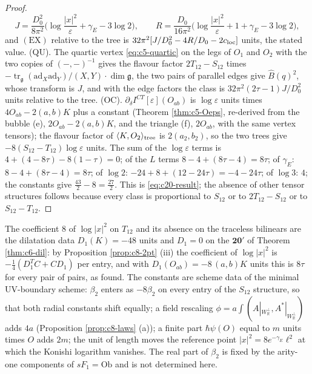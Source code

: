 \begin{proof}
\[
J=\frac{D_0^2}{8\pi^2}\Big(\log\frac{|x|^2}{\varepsilon}+\gamma_E-3\log2\Big),\qquad R=\frac{D_0}{16\pi^2}\Big(\log\frac{|x|^2}{\varepsilon}+1+\gamma_E-3\log2\Big),
\]
and $\mathrm{(EX)}$ relative to the tree is $32\pi^2[J/D_0^2-4R/D_0-2c_{\rm loc}]$ units, the stated value. (QU). The quartic vertex \eqref{eq:c5-quartic} on the legs of $O_1$ and $O_2$ with the two copies of $(-,-)^{-1}$ gives the flavour factor $2T_{12}-S_{12}$ times $-\operatorname{tr}_{\mathfrak g}(\mathrm{ad}_X\mathrm{ad}_Y)/(X,Y)\cdot\dim\mathfrak g$, the two pairs of parallel edges give $\hat B(q)^2$, whose transform is $J$, and with the edge factors the class is $32\pi^2(2\tau-1)J/D_0^2$ units relative to the tree. (OC). $\partial_\delta I^{CT}[\varepsilon](O_{ab})$ is $\log\varepsilon$ units times $4O_{ab}-2(a,b)K$ plus a constant (Theorem \ref{thm:c5-Oeps}, re-derived from the bubble (e), $2O_{ab}-2(a,b)K$, and the triangle (f), $2O_{ab}$, with the same vertex tensors); the flavour factor of $\langle K,O_2\rangle_{\rm tree}$ is $2(a_2,b_2)$, so the two trees give $-8(S_{12}-T_{12})\log\varepsilon$ units. The sum of the $\log\varepsilon$ terms is $4+(4-8\tau)-8(1-\tau)=0$; of the $L$ terms $8-4+(8\tau-4)=8\tau$; of $\gamma_E$: $8-4+(8\tau-4)=8\tau$; of $\log2$: $-24+8+(12-24\tau)=-4-24\tau$; of $\log3$: $4$; the constants give $\tfrac{43}2-8=\tfrac{27}2$. This is \eqref{eq:c20-result}; the absence of other tensor structures follows because every class is proportional to $S_{12}$ or to $2T_{12}-S_{12}$ or to $S_{12}-T_{12}$.
\end{proof}

\begin{remark}
\label{rem:c20-scheme}
The coefficient $8$ of $\log|x|^2$ on $T_{12}$ and its absence on the traceless bilinears are the dilatation data $D_1(K)=-48$ units and $D_1=0$ on the $\mathbf{20'}$ of Theorem \ref{thm:c6-dil}: by Proposition \ref{prop:c8-2pt} (iii) the coefficient of $\log|x|^2$ is $-\tfrac14(D_1^TC+CD_1)$ per entry, and with $D_1(O_{ab})=-8\,(a,b)K$ units this is $8\tau$ for every pair of pairs, as found. The constants are scheme data of the minimal UV-boundary scheme: $\beta_2$ enters as $-8\beta_2$ on every entry of the $S_{12}$ structure, so that both radial constants shift equally; a field rescaling $\phi=a\int(A|_{W_{\mathbb R}^\perp},A^*|_{W_{\mathbb R}^\perp})$ adds $4a$ (Proposition \ref{prop:c8-laws} (a)); a finite part $\hbar\psi(O)$ equal to $m$ units times $O$ adds $2m$; the unit of length moves the reference point $|x|^2=8e^{-\gamma_E}\ell^2$ at which the Konishi logarithm vanishes. The real part of $\beta_2$ is fixed by the arity-one components of $sF_1=\mathrm{Ob}$ and is not determined here.
\end{remark}

